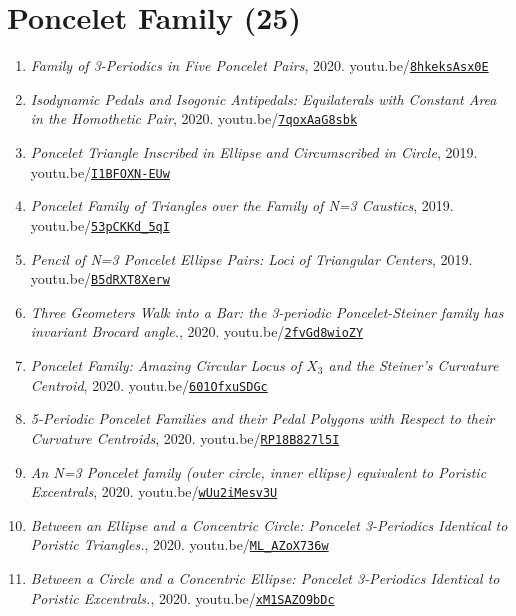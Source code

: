 \documentclass[12pt]{article}
\begin{document}
\section{Poncelet Family (25)}

\begin{enumerate}[resume]
\item \textit{Family of 3-Periodics in Five Poncelet Pairs}, 2020. youtu.be/\href{https://youtu.be/8hkeksAsx0E}{\nolinkurl{8hkeksAsx0E}}
\item \textit{Isodynamic Pedals and Isogonic Antipedals: Equilaterals with Constant Area in the Homothetic Pair}, 2020. youtu.be/\href{https://youtu.be/7qoxAaG8sbk}{\nolinkurl{7qoxAaG8sbk}}
\item \textit{Poncelet Triangle Inscribed in Ellipse and Circumscribed in Circle}, 2019. youtu.be/\href{https://youtu.be/I1BFOXN-EUw}{\nolinkurl{I1BFOXN-EUw}}
\item \textit{Poncelet Family of Triangles over the Family of N=3 Caustics}, 2019. youtu.be/\href{https://youtu.be/53pCKKd_5qI}{\nolinkurl{53pCKKd\_5qI}}
\item \textit{Pencil of N=3 Poncelet Ellipse Pairs: Loci of Triangular Centers}, 2019. youtu.be/\href{https://youtu.be/B5dRXT8Xerw}{\nolinkurl{B5dRXT8Xerw}}
\item \textit{Three Geometers Walk into a Bar: the 3-periodic Poncelet-Steiner family has invariant Brocard angle.}, 2020. youtu.be/\href{https://youtu.be/2fvGd8wioZY}{\nolinkurl{2fvGd8wioZY}}
\item \textit{Poncelet Family: Amazing Circular Locus of $X_{3}$ and the Steiner's Curvature Centroid}, 2020. youtu.be/\href{https://youtu.be/601OfxuSDGc}{\nolinkurl{601OfxuSDGc}}
\item \textit{5-Periodic Poncelet Families and their Pedal Polygons with Respect to their Curvature Centroids}, 2020. youtu.be/\href{https://youtu.be/RP18B827l5I}{\nolinkurl{RP18B827l5I}}
\item \textit{An N=3 Poncelet family (outer circle, inner ellipse) equivalent to Poristic Excentrals}, 2020. youtu.be/\href{https://youtu.be/wUu2iMesv3U}{\nolinkurl{wUu2iMesv3U}}
\item \textit{Between an Ellipse and a Concentric Circle: Poncelet 3-Periodics Identical to Poristic Triangles.}, 2020. youtu.be/\href{https://youtu.be/ML_AZoX736w}{\nolinkurl{ML\_AZoX736w}}
\item \textit{Between a Circle and a Concentric Ellipse: Poncelet 3-Periodics Identical to Poristic Excentrals.}, 2020. youtu.be/\href{https://youtu.be/xM1SAZO9bDc}{\nolinkurl{xM1SAZO9bDc}}

\end{enumerate}
\end{document}
